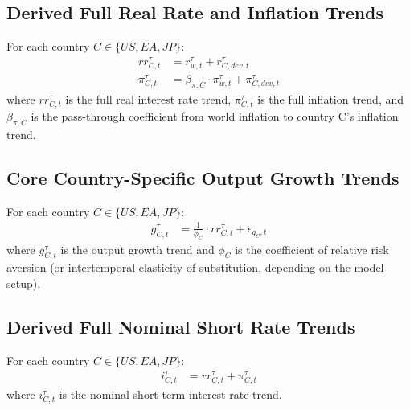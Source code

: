 \documentclass{article}
\begin{document}
\subsection*{Derived Full Real Rate and Inflation Trends}
For each country $C \in \{US, EA, JP\}$:
\begin{align}
rr_{C,t}^{\tau} &= r_{w,t}^{\tau} + r_{C,dev,t}^{\tau} \\
\pi_{C,t}^{\tau} &= \beta_{\pi,C} \cdot \pi_{w,t}^{\tau} + \pi_{C,dev,t}^{\tau}
\end{align}
where $rr_{C,t}^{\tau}$ is the full real interest rate trend, $\pi_{C,t}^{\tau}$ is the full inflation trend, and $\beta_{\pi,C}$ is the pass-through coefficient from world inflation to country C's inflation trend.

\subsection*{Core Country-Specific Output Growth Trends}
For each country $C \in \{US, EA, JP\}$:
\begin{align}
g_{C,t}^{\tau} &= \frac{1}{\phi_C} \cdot rr_{C,t}^{\tau} + \epsilon_{g_C,t}
\end{align}
where $g_{C,t}^{\tau}$ is the output growth trend and $\phi_C$ is the coefficient of relative risk aversion (or intertemporal elasticity of substitution, depending on the model setup).

\subsection*{Derived Full Nominal Short Rate Trends}
For each country $C \in \{US, EA, JP\}$:
\begin{align}
i_{C,t}^{\tau} &= rr_{C,t}^{\tau} + \pi_{C,t}^{\tau}
\end{align}
where $i_{C,t}^{\tau}$ is the nominal short-term interest rate trend.
\end{document}
